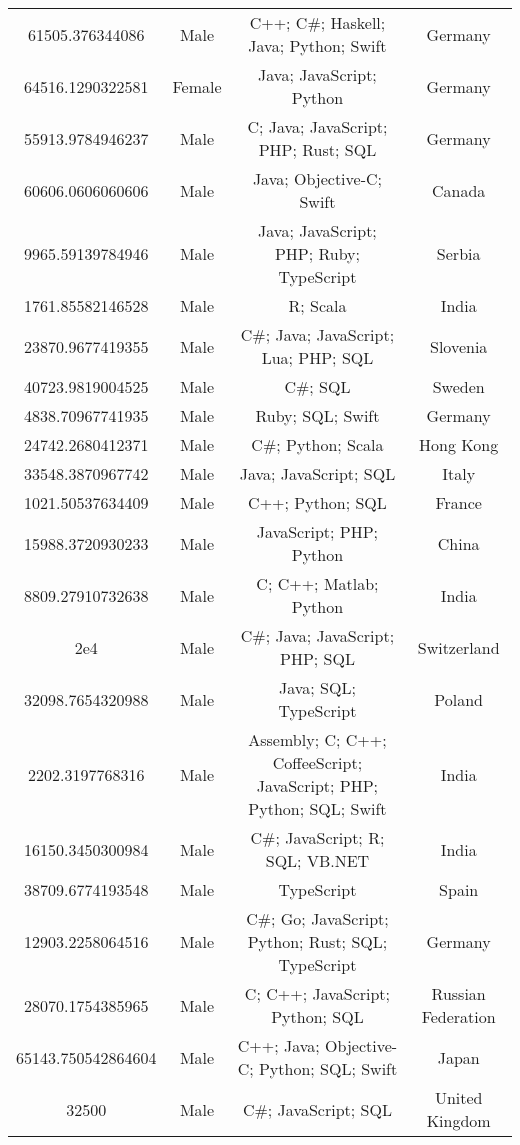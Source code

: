 \begin{center}
\begin{tabular}{ |c|c|c|c| }
61505.376344086  &  Male  &  C++; C\#; Haskell; Java; Python; Swift  &  Germany  \\ 
64516.1290322581  &  Female  &  Java; JavaScript; Python  &  Germany  \\ 
55913.9784946237  &  Male  &  C; Java; JavaScript; PHP; Rust; SQL  &  Germany  \\ 
60606.0606060606  &  Male  &  Java; Objective-C; Swift  &  Canada  \\ 
9965.59139784946  &  Male  &  Java; JavaScript; PHP; Ruby; TypeScript  &  Serbia  \\ 
1761.85582146528  &  Male  &  R; Scala  &  India  \\ 
23870.9677419355  &  Male  &  C\#; Java; JavaScript; Lua; PHP; SQL  &  Slovenia  \\ 
40723.9819004525  &  Male  &  C\#; SQL  &  Sweden  \\ 
4838.70967741935  &  Male  &  Ruby; SQL; Swift  &  Germany  \\ 
24742.2680412371  &  Male  &  C\#; Python; Scala  &  Hong Kong  \\ 
33548.3870967742  &  Male  &  Java; JavaScript; SQL  &  Italy  \\ 
1021.50537634409  &  Male  &  C++; Python; SQL  &  France  \\ 
15988.3720930233  &  Male  &  JavaScript; PHP; Python  &  China  \\ 
8809.27910732638  &  Male  &  C; C++; Matlab; Python  &  India  \\ 
2e4  &  Male  &  C\#; Java; JavaScript; PHP; SQL  &  Switzerland  \\ 
32098.7654320988  &  Male  &  Java; SQL; TypeScript  &  Poland  \\ 
2202.3197768316  &  Male  &  Assembly; C; C++; CoffeeScript; JavaScript; PHP; Python; SQL; Swift  &  India  \\ 
16150.3450300984  &  Male  &  C\#; JavaScript; R; SQL; VB.NET  &  India  \\ 
38709.6774193548  &  Male  &  TypeScript  &  Spain  \\ 
12903.2258064516  &  Male  &  C\#; Go; JavaScript; Python; Rust; SQL; TypeScript  &  Germany  \\ 
28070.1754385965  &  Male  &  C; C++; JavaScript; Python; SQL  &  Russian Federation  \\ 
65143.750542864604  &  Male  &  C++; Java; Objective-C; Python; SQL; Swift  &  Japan  \\ 
32500  &  Male  &  C\#; JavaScript; SQL  &  United Kingdom  \\ 

\end{tabular}
\end{center}
